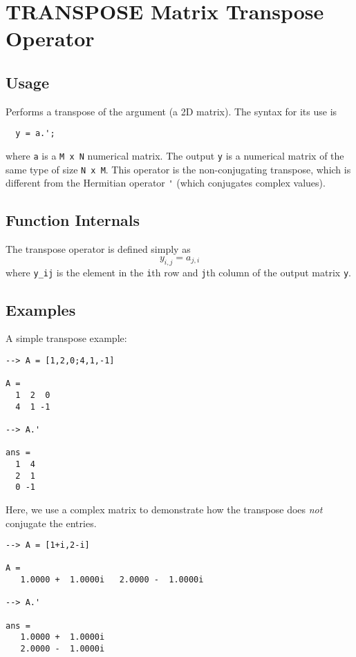 \section{TRANSPOSE Matrix Transpose Operator}

\subsection{Usage}

Performs a transpose of the argument (a 2D matrix).  The syntax for its use is
\begin{verbatim}
  y = a.';
\end{verbatim}
where \verb|a| is a \verb|M x N| numerical matrix.  The output \verb|y| is a numerical matrix
of the same type of size \verb|N x M|.  This operator is the non-conjugating transpose,
which is different from the Hermitian operator \verb|'| (which conjugates complex values).
\subsection{Function Internals}

The transpose operator is defined simply as
\[
  y_{i,j} = a_{j,i}
\]
where \verb|y_ij| is the element in the \verb|i|th row and \verb|j|th column of the output matrix \verb|y|.
\subsection{Examples}

A simple transpose example:
\begin{verbatim}
--> A = [1,2,0;4,1,-1]

A = 
  1  2  0 
  4  1 -1 

--> A.'

ans = 
  1  4 
  2  1 
  0 -1 
\end{verbatim}
Here, we use a complex matrix to demonstrate how the transpose does \emph{not} conjugate the entries.
\begin{verbatim}
--> A = [1+i,2-i]

A = 
   1.0000 +  1.0000i   2.0000 -  1.0000i 

--> A.'

ans = 
   1.0000 +  1.0000i 
   2.0000 -  1.0000i 
\end{verbatim}
